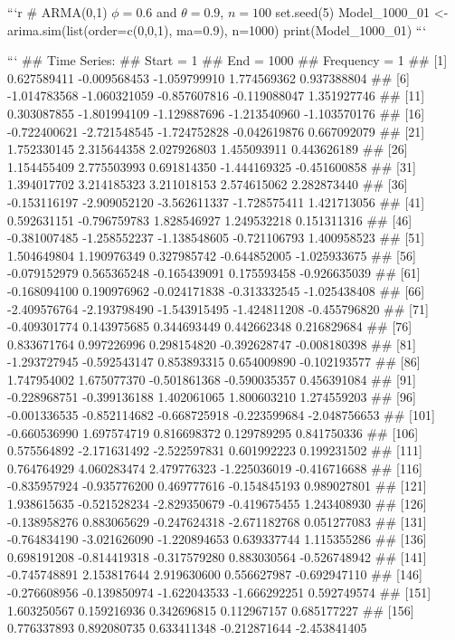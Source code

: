 \documentclass[
]{article}
\begin{document}
\begin{enumerate}[label=(\alph*)]
```r
# ARMA(0,1) $\phi=0.6$ and $\theta= 0.9$, $n=100$
set.seed(5)
Model_1000_01 <- arima.sim(list(order=c(0,0,1), ma=0.9), n=1000)
print(Model_1000_01)
```

```
## Time Series:
## Start = 1 
## End = 1000 
## Frequency = 1 
##    [1]  0.627589411 -0.009568453 -1.059799910  1.774569362  0.937388804
##    [6] -1.014783568 -1.060321059 -0.857607816 -0.119088047  1.351927746
##   [11]  0.303087855 -1.801994109 -1.129887696 -1.213540960 -1.103570176
##   [16] -0.722400621 -2.721548545 -1.724752828 -0.042619876  0.667092079
##   [21]  1.752330145  2.315644358  2.027926803  1.455093911  0.443626189
##   [26]  1.154455409  2.775503993  0.691814350 -1.444169325 -0.451600858
##   [31]  1.394017702  3.214185323  3.211018153  2.574615062  2.282873440
##   [36] -0.153116197 -2.909052120 -3.562611337 -1.728575411  1.421713056
##   [41]  0.592631151 -0.796759783  1.828546927  1.249532218  0.151311316
##   [46] -0.381007485 -1.258552237 -1.138548605 -0.721106793  1.400958523
##   [51]  1.504649804  1.190976349  0.327985742 -0.644852005 -1.025933675
##   [56] -0.079152979  0.565365248 -0.165439091  0.175593458 -0.926635039
##   [61] -0.168094100  0.190976962 -0.024171838 -0.313332545 -1.025438408
##   [66] -2.409576764 -2.193798490 -1.543915495 -1.424811208 -0.455796820
##   [71] -0.409301774  0.143975685  0.344693449  0.442662348  0.216829684
##   [76]  0.833671764  0.997226996  0.298154820 -0.392628747 -0.008180398
##   [81] -1.293727945 -0.592543147  0.853893315  0.654009890 -0.102193577
##   [86]  1.747954002  1.675077370 -0.501861368 -0.590035357  0.456391084
##   [91] -0.228968751 -0.399136188  1.402061065  1.800603210  1.274559203
##   [96] -0.001336535 -0.852114682 -0.668725918 -0.223599684 -2.048756653
##  [101] -0.660536990  1.697574719  0.816698372  0.129789295  0.841750336
##  [106]  0.575564892 -2.171631492 -2.522597831  0.601992223  0.199231502
##  [111]  0.764764929  4.060283474  2.479776323 -1.225036019 -0.416716688
##  [116] -0.835957924 -0.935776200  0.469777616 -0.154845193  0.989027801
##  [121]  1.938615635 -0.521528234 -2.829350679 -0.419675455  1.243408930
##  [126] -0.138958276  0.883065629 -0.247624318 -2.671182768  0.051277083
##  [131] -0.764834190 -3.021626090 -1.220894653  0.639337744  1.115355286
##  [136]  0.698191208 -0.814419318 -0.317579280  0.883030564 -0.526748942
##  [141] -0.745748891  2.153817644  2.919630600  0.556627987 -0.692947110
##  [146] -0.276608956 -0.139850974 -1.622043533 -1.666292251  0.592749574
##  [151]  1.603250567  0.159216936  0.342696815  0.112967157  0.685177227
##  [156]  0.776337893  0.892080735  0.633411348 -0.212871644 -2.453841405

\end{enumerate}
\end{document}
